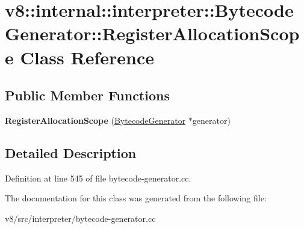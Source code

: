 \hypertarget{classv8_1_1internal_1_1interpreter_1_1BytecodeGenerator_1_1RegisterAllocationScope}{}\section{v8\+:\+:internal\+:\+:interpreter\+:\+:Bytecode\+Generator\+:\+:Register\+Allocation\+Scope Class Reference}
\label{classv8_1_1internal_1_1interpreter_1_1BytecodeGenerator_1_1RegisterAllocationScope}
\subsection*{Public Member Functions}
\begin{DoxyCompactItemize}
\item 
\mbox{\label{classv8_1_1internal_1_1interpreter_1_1BytecodeGenerator_1_1RegisterAllocationScope_ab1c62c9328b5013d6b4e4bcc0d06815d}} 
{\bfseries Register\+Allocation\+Scope} (\mbox{\hyperlink{classv8_1_1internal_1_1interpreter_1_1BytecodeGenerator}{Bytecode\+Generator}} $\ast$generator)
\end{DoxyCompactItemize}


\subsection{Detailed Description}


Definition at line 545 of file bytecode-\/generator.\+cc.



The documentation for this class was generated from the following file\+:\begin{DoxyCompactItemize}
\item 
v8/src/interpreter/bytecode-\/generator.\+cc\end{DoxyCompactItemize}
